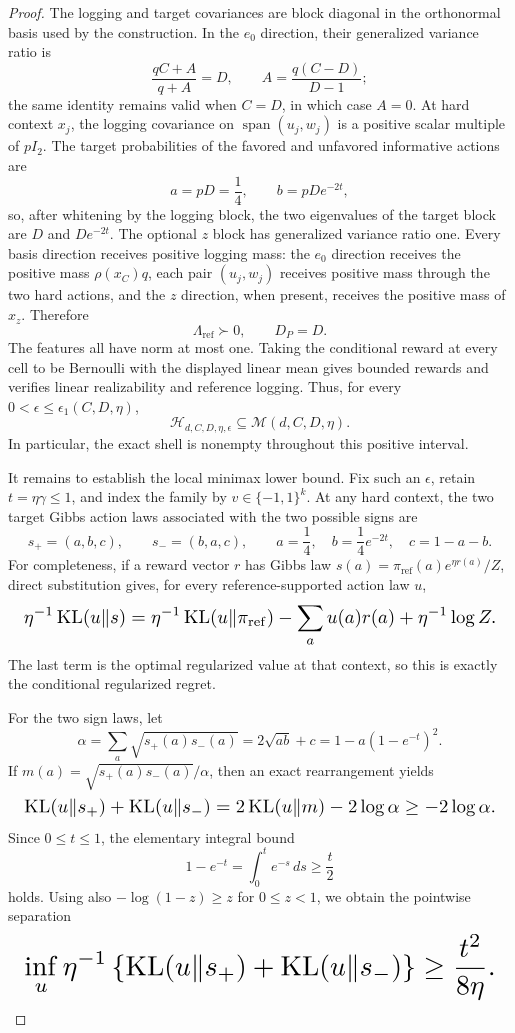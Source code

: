 \documentclass{article}
\begin{document}
\begin{proof}
The logging and target covariances are block diagonal in the orthonormal basis used by the construction. In the \(e_0\) direction, their generalized variance ratio is
\[
\frac{qC+A}{q+A}=D,
\qquad
A=\frac{q(C-D)}{D-1};
\]
the same identity remains valid when \(C=D\), in which case \(A=0\). At hard context \(x_j\), the logging covariance on \(\operatorname{span}(u_j,w_j)\) is a positive scalar multiple of \(pI_2\). The target probabilities of the favored and unfavored informative actions are
\[
a=pD=\frac14,\qquad b=pDe^{-2t},
\]
so, after whitening by the logging block, the two eigenvalues of the target block are \(D\) and \(De^{-2t}\). The optional \(z\) block has generalized variance ratio one. Every basis direction receives positive logging mass: the \(e_0\) direction receives the positive mass \(\rho(x_C)q\), each pair \((u_j,w_j)\) receives positive mass through the two hard actions, and the \(z\) direction, when present, receives the positive mass of \(x_z\). Therefore
\[
\Lambda_{\mathrm{ref}}\succ0,\qquad D_P=D.
\]
The features all have norm at most one. Taking the conditional reward at every cell to be Bernoulli with the displayed linear mean gives bounded rewards and verifies linear realizability and reference logging. Thus, for every \(0<\epsilon\le\epsilon_1(C,D,\eta)\),
\[
\mathcal H_{d,C,D,\eta,\epsilon}
\subseteq
\mathcal M(d,C,D,\eta).
\]
In particular, the exact shell is nonempty throughout this positive interval.

It remains to establish the local minimax lower bound. Fix such an \(\epsilon\), retain \(t=\eta\gamma\le1\), and index the family by \(v\in\{-1,1\}^k\). At any hard context, the two target Gibbs action laws associated with the two possible signs are
\[
s_+=(a,b,c),\qquad s_-=(b,a,c),\qquad
a=\frac14,\quad b=\frac14e^{-2t},\quad c=1-a-b.
\]
For completeness, if a reward vector \(r\) has Gibbs law \(s(a)=\pi_{\mathrm{ref}}(a)e^{\eta r(a)}/Z\), direct substitution gives, for every reference-supported action law \(u\),
\[
\makebox[\linewidth][c]{\resizebox{0.98\linewidth}{!}{\(\displaystyle \eta^{-1}\operatorname{KL}(u\Vert s)
=
\eta^{-1}\operatorname{KL}(u\Vert\pi_{\mathrm{ref}})
-\sum_a u(a)r(a)+\eta^{-1}\log Z.\)}}
\]
The last term is the optimal regularized value at that context, so this is exactly the conditional regularized regret.

For the two sign laws, let
\[
\alpha=\sum_a\sqrt{s_+(a)s_-(a)}
=2\sqrt{ab}+c
=1-a(1-e^{-t})^2.
\]
If \(m(a)=\sqrt{s_+(a)s_-(a)}/\alpha\), then an exact rearrangement yields
\[
\makebox[\linewidth][c]{\resizebox{0.98\linewidth}{!}{\(\displaystyle \operatorname{KL}(u\Vert s_+)+\operatorname{KL}(u\Vert s_-)
=2\operatorname{KL}(u\Vert m)-2\log\alpha
\ge-2\log\alpha.\)}}
\]
Since \(0\le t\le1\), the elementary integral bound
\[
1-e^{-t}=\int_0^t e^{-s}\,ds\ge\frac t2
\]
holds. Using also \(-\log(1-z)\ge z\) for \(0\le z<1\), we obtain the pointwise separation
\[
\makebox[\linewidth][c]{\resizebox{0.98\linewidth}{!}{\(\displaystyle \inf_u\eta^{-1}
\left\{
\operatorname{KL}(u\Vert s_+)+
\operatorname{KL}(u\Vert s_-)
\right\}
\ge
\frac{t^2}{8\eta}.\)}}
\]


\end{proof}
\end{document}
